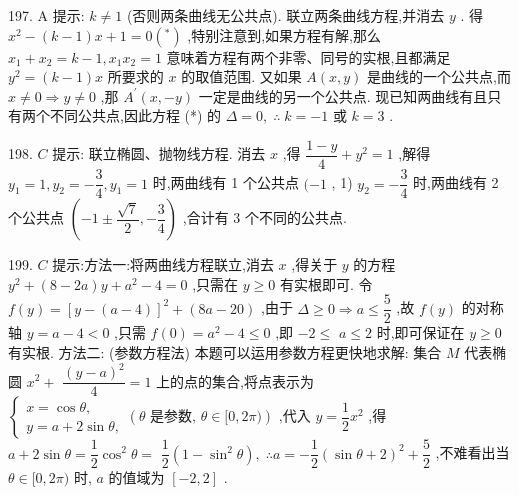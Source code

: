 197. A 提示: $k \neq  1$ (否则两条曲线无公共点). 联立两条曲线方程,并消去 $y$ . 得 ${x}^{2} - \left( {k - 1}\right) x + 1 = 0\left( {}^{ * }\right)$ ,特别注意到,如果方程有解,那么 ${x}_{1} + {x}_{2} = k - 1,{x}_{1}{x}_{2} = 1$ 意味着方程有两个非零、同号的实根,且都满足 ${y}^{2} = \left( {k - 1}\right) x$ 所要求的 $x$ 的取值范围. 又如果 $A\left( {x,y}\right)$ 是曲线的一个公共点,而 $x \neq  0 \Rightarrow  y \neq  0$ ,那 ${A}^{\prime }\left( {x, - y}\right)$ 一定是曲线的另一个公共点. 现已知两曲线有且只有两个不同公共点,因此方程 (*) 的 $\Delta  = 0,\;\therefore \;k =  - 1$ 或 $k = 3$ .

198. $C$ 提示: 联立椭圆、抛物线方程. 消去 $x$ ,得 $\dfrac{1 - y}{4} + {y}^{2} = 1$ ,解得 ${y}_{1} = 1,{y}_{2} =  - \dfrac{3}{4},{y}_{1} = 1$ 时,两曲线有 1 个公共点 $( - 1$ , 1) ${y}_{2} =  - \dfrac{3}{4}$ 时,两曲线有 2 个公共点 $\left( {-1 \pm  \dfrac{\sqrt{7}}{2}, - \dfrac{3}{4}}\right)$ ,合计有 3 个不同的公共点.

199. $C$ 提示:方法一:将两曲线方程联立,消去 $x$ ,得关于 $y$ 的方程 ${y}^{2} + \left( {8 - {2a}}\right) y + {a}^{2} - 4 = 0$ ,只需在 $y \geq  0$ 有实根即可. 令 $f\left( y\right)  = {\left\lbrack  y - \left( a - 4\right) \right\rbrack  }^{2} + \left( {{8a} - {20}}\right)$ ,由于 $\Delta  \geq  0 \Rightarrow  a \leq  \dfrac{5}{2}$ ,故 $f\left( y\right)$ 的对称轴 $y = a - 4 < 0$ ,只需 $f\left( 0\right)  = {a}^{2} - 4 \leq  0$ ,即 $- 2 \leq$  $a \leq  2$ 时,即可保证在 $y \geq  0$ 有实根. 方法二: (参数方程法) 本题可以运用参数方程更快地求解: 集合 $M$ 代表椭圆 ${x}^{2} +$  $\dfrac{{\left( y - a\right) }^{2}}{4} = 1$ 上的点的集合,将点表示为 $\left\{  {\begin{array}{l} x = \cos \theta , \\  y = a + 2\sin \theta , \end{array}\left( {\theta \text{ 是参数, }\theta  \in  \lbrack 0,{2\pi })}\right) \text{ ,代入 }y = \dfrac{1}{2}{x}^{2}}\right.$ ,得 $a + 2\sin \theta  = \dfrac{1}{2}{\cos }^{2}\theta  =$  $\dfrac{1}{2}\left( {1 - {\sin }^{2}\theta }\right) ,\;\therefore a =  - \dfrac{1}{2}{\left( \sin \theta  + 2\right) }^{2} + \dfrac{5}{2}$ ,不难看出当 $\theta  \in  \lbrack 0,{2\pi })$ 时, $a$ 的值域为 $\left\lbrack  {-2,2}\right\rbrack$ .

